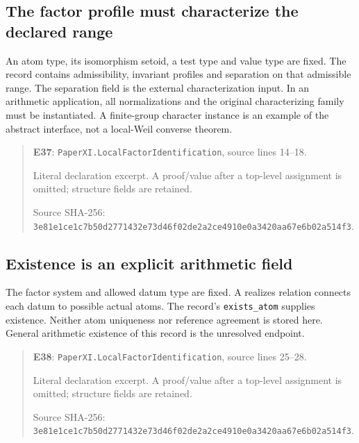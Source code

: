\documentclass[10pt,oneside]{book}
\begin{document}
\subsection{The factor profile must characterize the declared range}
\label{guide:E37}
An atom type, its isomorphism setoid, a test type and value type are fixed. The record contains admissibility, invariant profiles and separation on that admissible range.
The separation field is the external characterization input. In an arithmetic application, all normalizations and the original characterizing family must be instantiated. A finite-group character instance is an example of the abstract interface, not a local-Weil converse theorem.

\begin{quote}\footnotesize\textbf{E37}: \nolinkurl{PaperXI.LocalFactorIdentification}, source lines 14--18.\par Literal declaration excerpt. A proof/value after a top-level assignment is omitted; structure fields are retained.\par Source SHA-256: {\scriptsize\texttt{3e81e1ce1c7b50d2771432e73d46f02de2a2ce4910e0a3420aa67e6b02a514f3}}.\end{quote}


\subsection{Existence is an explicit arithmetic field}
\label{guide:E38}
The factor system and allowed datum type are fixed. A realizes relation connects each datum to possible actual atoms.
The record's \texttt{exists\_atom} supplies existence. Neither atom uniqueness nor reference agreement is stored here. General arithmetic existence of this record is the unresolved endpoint.

\begin{quote}\footnotesize\textbf{E38}: \nolinkurl{PaperXI.LocalFactorIdentification}, source lines 25--28.\par Literal declaration excerpt. A proof/value after a top-level assignment is omitted; structure fields are retained.\par Source SHA-256: {\scriptsize\texttt{3e81e1ce1c7b50d2771432e73d46f02de2a2ce4910e0a3420aa67e6b02a514f3}}.\end{quote}

\end{document}
